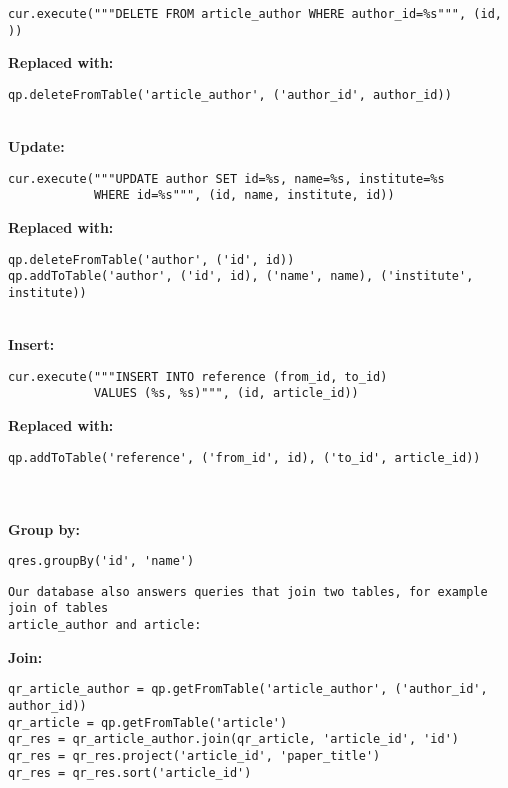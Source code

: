 \documentclass{article}
\begin{document}
\begin{verbatim}
cur.execute("""DELETE FROM article_author WHERE author_id=%s""", (id, ))
\end{verbatim}

\textbf{Replaced with:}

\begin{verbatim}
qp.deleteFromTable('article_author', ('author_id', author_id))
\end{verbatim}
~
\\
\textbf{Update:}

\begin{verbatim}
cur.execute("""UPDATE author SET id=%s, name=%s, institute=%s
            WHERE id=%s""", (id, name, institute, id))
\end{verbatim}

\textbf{Replaced with:}

\begin{verbatim}
qp.deleteFromTable('author', ('id', id))
qp.addToTable('author', ('id', id), ('name', name), ('institute', institute))
\end{verbatim}
~
\\
\textbf{Insert:}
\begin{verbatim}
cur.execute("""INSERT INTO reference (from_id, to_id)
            VALUES (%s, %s)""", (id, article_id))
\end{verbatim}

\textbf{Replaced with:}

\begin{verbatim}
qp.addToTable('reference', ('from_id', id), ('to_id', article_id))
\end{verbatim}
~
\\
\\
\textbf{Group by:}

\begin{verbatim}
qres.groupBy('id', 'name')
\end{verbatim}

\begin{verbatim}
Our database also answers queries that join two tables, for example join of tables 
article_author and article:
\end{verbatim}

\textbf{Join:}

\begin{verbatim}
qr_article_author = qp.getFromTable('article_author', ('author_id', author_id))
qr_article = qp.getFromTable('article')
qr_res = qr_article_author.join(qr_article, 'article_id', 'id')
qr_res = qr_res.project('article_id', 'paper_title')
qr_res = qr_res.sort('article_id')
\end{verbatim}
\end{document}
